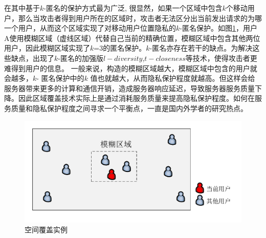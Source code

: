 在其中基于$k$-匿名的保护方式最为广泛\cite{Bamba}\cite{Mokbel}\cite{wang2010device}\cite{pan2012protecting}, 很显然，如果一个区域中包含$k$个移动用户，那么当攻击者得到用户所在的区域时，攻击者无法区分出当前发出请求的为哪一个用户，从而这个区域实现了对移动用户位置隐私的$k$-匿名保护。如图\ref{fig:cloaking_pdf}，用户A使用模糊区域（虚线区域）代替自己当前的精确位置，模糊区域中包含其他两位用户，因此模糊区域实现了$k$=3的匿名保护。$k$-匿名亦存在若干的缺点\cite{juncheng2014potential}。为解决这些缺点，出现了$k$-匿名的加强版$l-diversity$\cite{machanavajjhala2007diversity},$t-closeness$\cite{li2007t}等技术，使得攻击者更难得到用户的信息。 一般来说，构造的模糊区域越大，模糊区域中包含的用户就会越多，$k$- 匿名保护中的$k$ 值也就越大，从而隐私保护程度就越高。但这样会给服务器带来更多的计算和通信开销，造成服务器响应延迟，导致服务器服务质量下降。因此区域覆盖技术实际上是通过消耗服务质量来提高隐私保护程度。如何在服务质量和隐私保护程度之间寻求一个平衡点，一直是国内外学者的研究热点。
\begin{figure}[H]
\centering
\includegraphics[width=15cm]{fig/cloaking.pdf}
\caption{空间覆盖实例} %
\label{fig:cloaking_pdf}
\end{figure}

